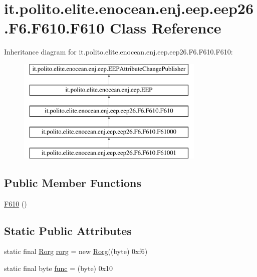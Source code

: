 \hypertarget{classit_1_1polito_1_1elite_1_1enocean_1_1enj_1_1eep_1_1eep26_1_1_f6_1_1_f610_1_1_f610}{}\section{it.\+polito.\+elite.\+enocean.\+enj.\+eep.\+eep26.\+F6.\+F610.\+F610 Class Reference}
\label{classit_1_1polito_1_1elite_1_1enocean_1_1enj_1_1eep_1_1eep26_1_1_f6_1_1_f610_1_1_f610}
Inheritance diagram for it.\+polito.\+elite.\+enocean.\+enj.\+eep.\+eep26.\+F6.\+F610.\+F610\+:\begin{figure}[H]
\begin{center}
\leavevmode
\includegraphics[height=5.000000cm]{classit_1_1polito_1_1elite_1_1enocean_1_1enj_1_1eep_1_1eep26_1_1_f6_1_1_f610_1_1_f610}
\end{center}
\end{figure}
\subsection*{Public Member Functions}
\begin{DoxyCompactItemize}
\item 
\hyperlink{classit_1_1polito_1_1elite_1_1enocean_1_1enj_1_1eep_1_1eep26_1_1_f6_1_1_f610_1_1_f610_a857ea579996963fa38d2b0d46c6c053a}{F610} ()
\end{DoxyCompactItemize}
\subsection*{Static Public Attributes}
\begin{DoxyCompactItemize}
\item 
static final \hyperlink{classit_1_1polito_1_1elite_1_1enocean_1_1enj_1_1eep_1_1_rorg}{Rorg} \hyperlink{classit_1_1polito_1_1elite_1_1enocean_1_1enj_1_1eep_1_1eep26_1_1_f6_1_1_f610_1_1_f610_aeba415ab308b3e7a192e8a004a77a379}{rorg} = new \hyperlink{classit_1_1polito_1_1elite_1_1enocean_1_1enj_1_1eep_1_1_rorg}{Rorg}((byte) 0xf6)
\item 
static final byte \hyperlink{classit_1_1polito_1_1elite_1_1enocean_1_1enj_1_1eep_1_1eep26_1_1_f6_1_1_f610_1_1_f610_afc30aa853afcccfa26c77016fb114a48}{func} = (byte) 0x10
\end{DoxyCompactItemize}
